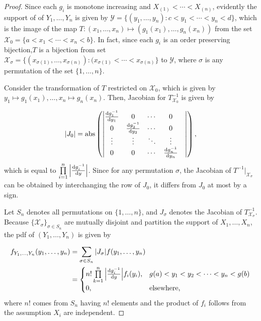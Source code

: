 \documentclass{report}
\begin{document}
    \begin{proof}
        Since each $g_i$ is monotone increasing and $X_{(1)} < \cdots < X_{(n)}$, evidently the support of 
         of $Y_1,\ldots,Y_n$ is given by $\mathcal Y = \{(y_1,\ldots,y_n) : c < y_1 <\cdots < y_n < d \}$, which is the image of 
        the map $T: (x_1,\ldots, x_n) \mapsto (g_1(x_1),\ldots, g_n(x_n))$ from the
        set $\mathcal X_0 = \{a < x_1 < \cdots < x_n <b\}$. In fact, since each $g_i$ is an order preserving bijection,$T$ is
        a bijection from set $\mathcal X_{\sigma} =\{(x_{\sigma(1)},\ldots, x_{\sigma(n)}):(x_{\sigma(1)} < \cdots < x_{\sigma(n)} \}$ to $\mathcal Y$, where $\sigma$ is any
        permutation of the set $\{1,\ldots,n\}$.
    
         Consider the transformation of $T$ restricted on $\mathcal X_0$, which is given by
        $y_1 \mapsto g_1(x_1),\ldots, x_n \mapsto g_n(x_n)$. Then, Jacobian for $T^{-1}_{\mathcal X_0}$ is given by
    
        \[ 
             \abs{J_0} = \mathrm{abs}\left(\begin{vmatrix}
                \dv{g_1^{-1}}{y_1} & 0 &  \cdots & 0 \\
                0 & \dv{g_2^{-1}}{y_2} & \cdots & 0 & \\
                \vdots & \vdots & \ddots & \vdots \\
                0 & 0  & \cdots & \dv{g_n^{-1}}{y_n}
            \end{vmatrix}\right),
        \]
        which is equal to $\prod\limits_{i=1}^{n} \abs{ \dv{g_i^{-1}}{y}}$. Since for any permutation $\sigma$, the Jacobian of $T^{-1}|_{\mathcal X_\sigma}$ can be obtained by interchanging the row of $J_0$,
        it differs from $J_0$ at most by a sign. 
    
        Let $S_n$ denotes all permutations on $\{1,\ldots,n\}$, and $J_\sigma$ denotes the Jacobian of $T^{-1}_{\mathcal X_\sigma}$.
        Because $\{\mathcal X_\sigma\}_{\sigma \in S_n}$ are mutually disjoint and partition the support of $X_1,\ldots,X_n$, 
        the pdf of $(Y_1,\ldots, Y_n)$ is given by
    
        \begin{align*}
            f_{Y_1,\ldots,Y_n}(y_1,\ldots, y_n) &= \sum_{\sigma \in S_n} \abs{J_{\sigma}} f(y_1,\ldots, y_n)
            \\
            &= \begin{cases}
                n! \prod\limits_{k=1}^{n} \abs{ \dv{g_i^{-1}}{y}} f_i(y_i), & g(a) < y_1 < y_2 <\cdots < y_n < g(b)
                \\
                0, & \text{elsewhere,}
            \end{cases}
        \end{align*}
        where $n!$ comes from $S_n$ having $n!$ elements and the product of $f_i$ follows from the assumption $X_i$ are independent.
    \end{proof}
\end{document}

